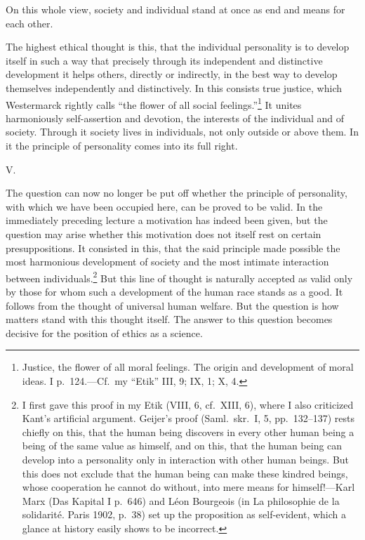 \documentclass[12pt]{article}
\newcommand{\opage}[1]{\marginnote{\footnotesize\textit{[#1]}}}
\begin{document}
On this whole view, society and individual stand at once as end and means for
each other.

The highest ethical thought is this, that the individual personality is to
develop itself in such a way that precisely through its independent and
distinctive development it helps others, directly or indirectly, in the best
way to develop themselves independently and distinctively. In this consists true
justice, which Westermarck rightly calls ``the
\opage{49}%
flower of all social feelings.''\footnote{Justice, the flower of all moral
feelings. The origin and development of moral ideas. I p.~124.---Cf.\ my
``Etik'' III, 9; IX, 1; X, 4.} It unites harmoniously self-assertion and
devotion, the interests of the individual and of society. Through it society
lives in individuals, not only outside or above them. In it the principle of
personality comes into its full right.

\opage{50}
\begin{center}\large V.\end{center}

The question can now no longer be put off whether the principle of personality,
with which we have been occupied here, can be proved to be valid. In the
immediately preceding lecture a motivation has indeed been given, but the
question may arise whether this motivation does not itself rest on certain
presuppositions. It consisted in this, that the said principle made possible the
most harmonious development of society and the most intimate interaction between
individuals.\footnote{I first gave this proof in my Etik (VIII, 6, cf.\ XIII,
6), where I also criticized Kant's artificial argument. Geijer's proof (Saml.\
skr.\ I, 5, pp.~132--137) rests chiefly on this, that the human being discovers
in every other human being a being of the same value as himself, and on this,
that the human being can develop into a personality only in interaction with
other human beings. But this does not exclude that the human being can make
these kindred beings, whose cooperation he cannot do without, into mere means
for himself!---Karl Marx (Das Kapital I p.~646) and Léon Bourgeois (in La
philosophie de la solidarité. Paris 1902, p.~38) set up the proposition as
self-evident, which a glance at history easily shows to be incorrect.} But this
line of thought is
\opage{51}%
naturally accepted as valid only by those for whom such a development of the
human race stands as a good. It follows from the thought of universal human
welfare. But the question is how matters stand with this thought itself. The
answer to this question becomes decisive for the position of ethics as a
science.
\end{document}
